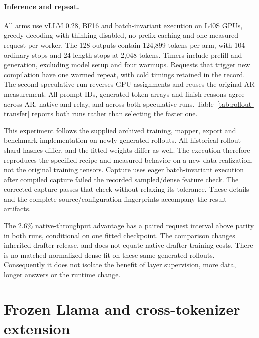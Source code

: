 \documentclass{article}
\begin{document}
\paragraph{Inference and repeat.}
All arms use vLLM 0.28, BF16 and batch-invariant execution on L40S GPUs,
greedy decoding with thinking disabled, no prefix caching and one measured
request per worker. The 128 outputs contain 124,899 tokens per arm, with
104 ordinary stops and 24 length stops at 2,048 tokens. Timers include
prefill and generation, excluding model setup and four warmups. Requests
that trigger new compilation have one warmed repeat, with cold timings
retained in the record. The second speculative run reverses GPU assignments
and reuses the original AR measurement. All prompt IDs, generated token
arrays and finish reasons agree across AR, native and relay, and across
both speculative runs. Table~\ref{tab:rollout-transfer} reports both runs
rather than selecting the faster one.

This experiment follows the supplied archived training, mapper, export
and benchmark implementation on newly generated rollouts. All historical
rollout shard hashes differ, and the fitted weights differ as well.
The execution therefore reproduces the specified recipe and measured
behavior on a new data realization, not the original training tensors.
Capture uses eager batch-invariant execution after compiled capture
failed the recorded sampled/dense feature check. The corrected capture
passes that check without relaxing its tolerance. These details and the
complete source/configuration fingerprints accompany the result artifacts.

The 2.6\% native-throughput advantage has a paired request interval above
parity in both runs, conditional on one fitted checkpoint. The comparison
changes inherited drafter release, and does not equate native drafter
training costs. There is no matched normalized-dense fit on these same
generated rollouts. Consequently it does not isolate the benefit of
layer supervision, more data, longer answers or the runtime change.

\section{Frozen Llama and cross-tokenizer extension}
\label{app:family-extension}

\begin{table}[H]
\caption{Frozen 128-question MATH evaluation. End-to-end tokens/s,
2,048-token cap, FP32 target and BF16 drafter. Every mapper arm matches
the full AR token sequence on all 128 requests. Original and selected
recipes differ in data and optimization.}
\label{tab:family128}
\centering\small
\setlength{\tabcolsep}{3pt}

\end{table}
\end{document}
